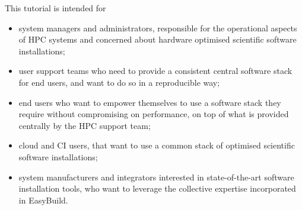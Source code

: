 This tutorial is intended for
\begin{itemize}
    \item system managers and administrators, responsible for the operational aspects of HPC systems and concerned about hardware optimised scientific software installations;
    \item user support teams who need to provide a consistent central software stack for end users, and want to do so in a reproducible way;
    \item end users who want to empower themselves to use a software stack they require without compromising on performance, on top of what is provided centrally by the HPC support team;
    \item cloud and CI users, that want to use a common stack of optimised scientific software installations;
    \item system manufacturers and integrators interested in state-of-the-art software installation tools, who want to leverage the collective expertise incorporated in EasyBuild.
\end{itemize}
